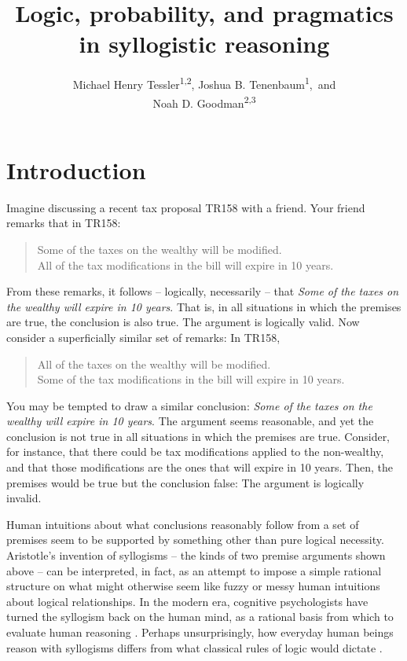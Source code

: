 \documentclass[floatsintext, man]{apa6}
\title{Logic, probability, and pragmatics in syllogistic reasoning}
\author{Michael Henry Tessler\textsuperscript{1}\textsuperscript{,2}, Joshua B. Tenenbaum\textsuperscript{1},~and \\Noah D. Goodman\textsuperscript{2}\textsuperscript{,3}}
\date{}
\affiliation{
\vspace{0.5cm}
\textsuperscript{1} Department of Brain and Cognitive Sciences, Massachusetts Institute of Technology \\
\textsuperscript{2} Department of Psychology, Stanford University \\
\textsuperscript{3} Department of Computer Science, Stanford University
}
\date{}
\begin{document}
\maketitle



\newpage

\section{Introduction}

Imagine discussing a recent tax proposal TR158 with a friend. Your friend remarks that in TR158:

\begin{quote}
Some of the taxes on the wealthy will be modified. \\
All of the tax modifications in the bill will expire in 10 years.
\end{quote}

From these remarks, it follows -- logically, necessarily -- that \emph{Some of the taxes on the wealthy will expire in 10 years}.
That is, in all situations in which the premises are true, the conclusion is also true. 
The argument is logically valid.
Now consider a superficially similar set of remarks: In TR158,

\begin{quote}
All of the taxes on the wealthy will be modified. \\
Some of the tax modifications in the bill will expire in 10 years.
\end{quote}

You may be tempted to draw a similar conclusion:  \emph{Some of the taxes on the wealthy will expire in 10 years}.
The argument seems reasonable, and yet the conclusion is not true in all situations in which the premises are true.
Consider, for instance, that there could be tax modifications applied to the non-wealthy, and that those modifications are the ones that will expire in 10 years.
Then, the premises would be true but the conclusion false: The argument is logically invalid.

Human intuitions about what conclusions reasonably follow from a set of premises seem to be supported by something other than pure logical necessity. 
Aristotle's invention of syllogisms -- the kinds of two premise arguments shown above -- can be interpreted, in fact, as an attempt to impose a simple rational structure on what might otherwise seem like fuzzy or messy human intuitions about logical relationships.
In the modern era, cognitive psychologists have turned the syllogism back on the human mind, as a rational basis from which to evaluate human reasoning \cite{Storring1908}.
Perhaps unsurprisingly, how everyday human beings reason with syllogisms differs from what classical rules of logic would dictate \cite<for a meta-analysis, see:>{Khemlani2012}.
\end{document}
